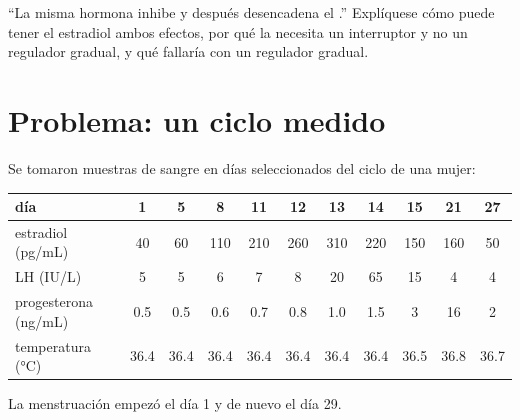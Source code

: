 \begin{exercise}[$\star\star\star$]\label{exo:b2:reproductive-hormones:12}
``La misma hormona inhibe y después desencadena el .''
Explíquese cómo puede tener el estradiol ambos efectos, por qué la
 necesita un interruptor y no un regulador gradual, y qué
fallaría con un regulador gradual.
\end{exercise}

\section{Problema: un ciclo medido}

\begin{problem}
\label{pb:b2:reproductive-hormones:1}
Se tomaron muestras de sangre en días seleccionados del ciclo de una
mujer:

\begin{center}
\small
\begin{tabular}{lcccccccccc}
\hline
día & 1 & 5 & 8 & 11 & 12 & 13 & 14 & 15 & 21 & 27 \\
\hline
estradiol (\unit{pg/mL}) & 40 & 60 & 110 & 210 & 260 & 310 & 220 & 150 & 160 & 50 \\
LH (\unit{IU/L}) & 5 & 5 & 6 & 7 & 8 & 20 & 65 & 15 & 4 & 4 \\
progesterona (\unit{ng/mL}) & 0.5 & 0.5 & 0.6 & 0.7 & 0.8 & 1.0 & 1.5 & 3 & 16 & 2 \\
temperatura (\unit{\celsius}) & 36.4 & 36.4 & 36.4 & 36.4 & 36.4 & 36.4 & 36.4 & 36.5 & 36.8 & 36.7 \\
\hline
\end{tabular}
\end{center}

La menstruación empezó el día 1 y de nuevo el día 29.


\end{problem}
